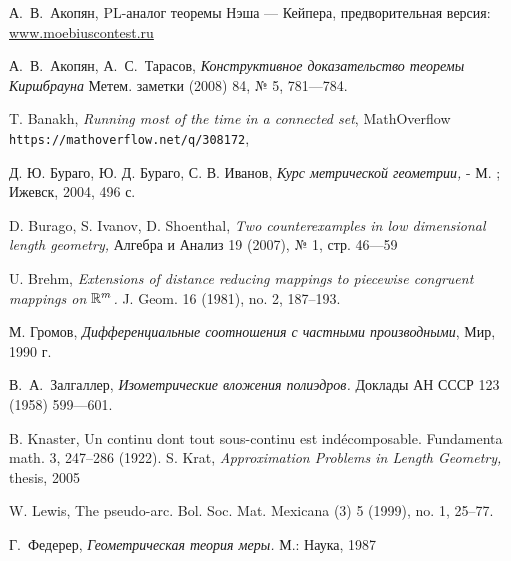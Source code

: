 \documentclass[oneside,a4paper]{article}
\begin{document}
\begin{thebibliography}{52} 
 А.~В.~Акопян, {PL-аналог теоремы Нэша --- Кейпера}, предворительная версия:
\href{http://www.moebiuscontest.ru/files/2007/akopyan.pdf}{www.moebiuscontest.ru}

А.~В.~Акопян, А.~С.~Тарасов,
\textit{Конструктивное доказательство теоремы Киршбрауна} Метем. заметки (2008) 84, № 5, 781---784. 

 T. Banakh,  \textit{Running most of the time in a connected set},  MathOverflow   \texttt{https://mathoverflow.net/q/308172},

 Д. Ю. Бураго, Ю. Д. Бураго, С. В. Иванов, \textit{Курс метрической геометрии,} - М. ; Ижевск, 2004, 496 с.

  D. Burago, S. Ivanov, D. Shoenthal, \textit{Two counterexamples in low dimensional length geometry,}
Алгебра и Анализ  19 (2007), № 1, стр. 46---59

 U. Brehm, \textit{Extensions of distance reducing mappings to piecewise congruent mappings on $\mathbb{R}^m$.}  J. Geom.  16  (1981), no. 2, 187--193.

 М. Громов,  \textit{Дифференциальные соотношения с частными производными}, Мир, 1990 г.

 В.~А.~Залгаллер,
\textit{Изометрические вложения полиэдров.}
Доклады АН СССР 123 (1958) 599---601.

 B. Knaster,  Un continu dont tout sous-continu est ind\'ecomposable. Fundamenta math. 3, 247--286 (1922).
 S. Krat,  \textit{Approximation Problems in Length Geometry,} thesis, 2005

 W. Lewis,  The pseudo-arc. Bol. Soc. Mat. Mexicana (3) 5 (1999), no. 1, 25--77.

 Г.~Федерер, \textit{Геометрическая теория меры.} М.: Наука, 1987
\end{thebibliography}
\end{document}
